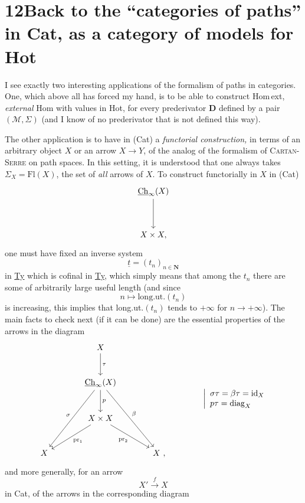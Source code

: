 \documentclass[11pt]{article}
\newcommand{\printedpage}[1]{\marginpar{\footnotesize p.~#1}}
\newcommand{\msp}[1]{\marginpar{\footnotesize [#1]}}
\newcommand{\uCh}{\underline{\mathrm{Ch}}}
\begin{document}
\section*{12\quad Back to the ``categories of paths'' in \textmd{Cat}, as a category of models for \textmd{Hot}}

I see exactly two interesting applications of the formalism of paths in categories. One, which above all has forced my hand, is to be able to construct Hom\,ext, \textit{external} Hom with values in Hot, for every prederivator $\mathbf{D}$ defined by a pair $(\mathcal{M},\Sigma)$ (and I know of no prederivator that is not defined this way).

The other application is to have in (Cat) a \textit{functorial construction,} in terms of an arbitrary object $X$ or an arrow $X\longrightarrow Y$, of the analog of the formalism of \textsc{Cartan-Serre} on path spaces. In this setting, it is understood that one always takes $\Sigma_X=\mathrm{Fl}(X)$, the set of \textit{all} arrows of $X$. To construct functorially in $X$ in (Cat)
\[
\begin{tikzcd}[row sep=huge]
\uCh_\infty(X) \arrow[d] \\
X\times X,
\end{tikzcd}
\]
one must have fixed an inverse system
\[
\underline{t}=(t_n)_{n\in\mathbf{N}}
\]
\msp{page 138}
in \underline{Ty} which is cofinal in \underline{Ty}, which simply means that among the $t_n$ there are some of arbitrarily large useful length (and since
\[
n\longmapsto\mathrm{long.ut.}(t_n)
\]
is increasing, this implies that long.ut.$(t_n)$ tends to $+\infty$ for $n\longrightarrow+\infty$). The main facts to check next (if it can be done) are the essential properties of the arrows in the diagram
\printedpage{86}
\[
\begin{tikzcd}[column sep=large, row sep=large]
& X \arrow[d, "\tau"] & \\
& \uCh_\infty(X) \arrow[d, "p"] \arrow[ddl, "\sigma"'] \arrow[ddr, "\beta"] & \\
& X\times X \arrow[dl, "\mathrm{pr}_1"] \arrow[dr, "\mathrm{pr}_2"'] & \\
X & & X\ ,
\end{tikzcd}
\qquad\qquad
\left|\begin{array}{l}
\sigma\tau=\beta\tau=\mathrm{id}_X\\
p\tau=\mathrm{diag}_X
\end{array}\right.
\]
and more generally, for an arrow
\[
X'\xrightarrow{\ f\ }X
\]
in Cat, of the arrows in the corresponding diagram
\end{document}
